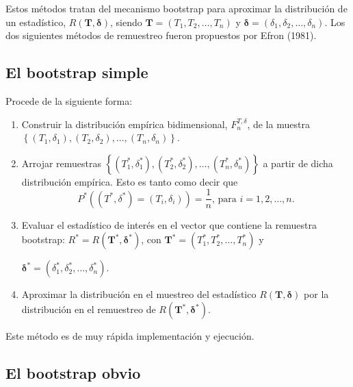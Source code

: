 \documentclass[
]{book}
\theoremstyle{break}
\theoremstyle{definition}
\theoremstyle{definition}
\theoremstyle{definition}
\theoremstyle{remark}
\begin{document}
Estos métodos tratan del mecanismo bootstrap para aproximar la
distribución de un estadístico, \(R\left( \mathbf{T}, \boldsymbol{\delta} \right)\), siendo \(\mathbf{T}=\left( T_1, T_2, \ldots,T_n \right)\) y \(\boldsymbol{\delta}=\left( \delta _1,\delta_2, \ldots ,\delta _n \right)\). Los dos siguientes métodos de
remuestreo fueron propuestos por Efron (1981).

\hypertarget{el-bootstrap-simple}{%
\subsection{El bootstrap simple}\label{el-bootstrap-simple}}

Procede de la siguiente forma:

\begin{enumerate}
\def\labelenumi{\arabic{enumi}.}
\item
  Construir la distribución empírica bidimensional,
  \(F_n^{T,\delta }\), de la muestra
  \(\left\{ \left( T_1,\delta _1 \right), \left( T_2,\delta _2 \right), \ldots, \left( T_n,\delta _n \right) \right\}\).
\item
  Arrojar remuestras \(\left\{ \left( T_1^{\ast},\delta _1^{\ast} \right), \left( T_2^{\ast},\delta _2^{\ast} \right), \ldots, \left( T_n^{\ast},\delta _n^{\ast} \right) \right\}\)
  a partir de dicha distribución empírica. Esto es tanto como decir
  que\[P^{\ast}\left( \left( T^{\ast},\delta^{\ast} \right) =\left( T_i,\delta
  _i \right) \right) =\frac{1}{n}\text{, para }i=1,2,\ldots ,n\text{.}\]
\item
  Evaluar el estadístico de interés en el vector que contiene la
  remuestra bootstrap: \(R^{\ast}=R\left( \mathbf{T}^{\ast}, \boldsymbol{\delta}^{\ast} \right)\), con
  \(\mathbf{T}^{\ast} =\left( T_1^{\ast},T_2^{\ast},\ldots ,T_n^{\ast} \right)\) y

  \(\boldsymbol{\delta}^{\ast}=\left( \delta _1^{\ast},\delta _2^{\ast},\ldots ,\delta _n^{\ast} \right)\).
\item
  Aproximar la distribución en el muestreo del estadístico
  \(R\left( \mathbf{T}, \boldsymbol{\delta} \right)\) por la
  distribución en el remuestreo de \(R\left( \mathbf{T}^{\ast},\boldsymbol{\delta}^{\ast} \right)\).
\end{enumerate}

Este método es de muy rápida implementación y ejecución.

\hypertarget{bootcen-obvio}{%
\subsection{El bootstrap obvio}\label{bootcen-obvio}}
\end{document}
